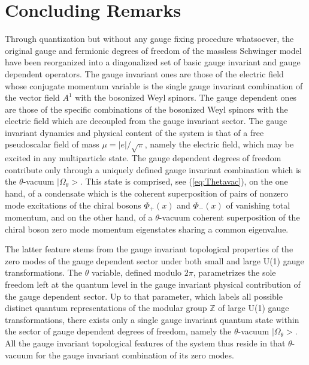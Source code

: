 \documentclass[a4paper,11pt]{article}
\def\Z{\mathbb Z}
\begin{document}
\section{Concluding Remarks}
\label{Sect6}

Through quantization but without any gauge fixing procedure
whatsoever, the original gauge and fermionic degrees of freedom of the massless
Schwinger model have been reorganized into a diagonalized set of basic gauge 
in\-va\-riant and gauge dependent operators. The gauge invariant ones are
those of the electric field whose conjugate momentum variable is the single 
gauge in\-va\-riant combination of the vector field $A^1$ with the bosonized 
Weyl spinors. The gauge dependent ones are those of the specific combinations 
of the bosonized Weyl spinors with the electric field which are decoupled from 
the gauge invariant sector. The gauge invariant dynamics and physical 
content of the system is that of a free pseudoscalar field of mass 
$\mu=|e|/\sqrt{\pi}$, namely the electric field, which may be excited in 
any multiparticle state. The gauge dependent degrees of freedom contribute
only through a uniquely defined gauge in\-va\-riant combination which is the
$\theta$-vacuum $|\Omega_\theta>$. This state is comprised, 
see (\ref{eq:Thetavac}), on the one hand,
of a condensate which is the coherent superposition of pairs of nonzero mode 
excitations of the chiral bosons $\Phi_+(x)$ and $\Phi_-(x)$ of vanishing 
total momentum, and on the other hand, of a $\theta$-vacuum coherent
superposition of the chiral boson zero mode momentum eigenstates sharing
a common eigenvalue. 

The latter feature stems from the gauge invariant
topological properties of the zero modes of the gauge dependent sector
under both small and large U(1) gauge transformations. The $\theta$ variable,
defined modulo $2\pi$, parametrizes the sole freedom left at the quantum
level in the gauge invariant physical contribution of the gauge dependent
sector. Up to that parameter, which labels all possible distinct quantum
representations of the modular group $\Z$ of large U(1) gauge transformations, 
there exists only a single gauge in\-va\-riant quantum state within the sector 
of gauge dependent degrees of freedom, namely the $\theta$-vacuum 
$|\Omega_\theta>$. All the gauge invariant topological features of the system 
thus reside in that $\theta$-vacuum for the gauge invariant combination of 
its zero modes.
\end{document}
